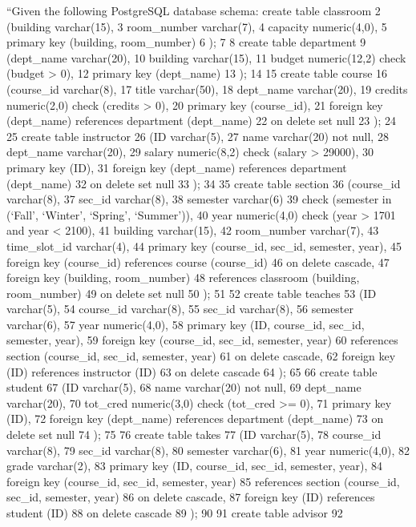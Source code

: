 \documentclass[
  letterpaper,
  DIV=11,
  numbers=noendperiod]{scrartcl}
\begin{document}
``Given the following PostgreSQL database schema: create table classroom
2 (building varchar(15), 3 room\_number varchar(7), 4 capacity
numeric(4,0), 5 primary key (building, room\_number) 6 ); 7 8 create
table department 9 (dept\_name varchar(20), 10 building varchar(15), 11
budget numeric(12,2) check (budget \textgreater{} 0), 12 primary key
(dept\_name) 13 ); 14 15 create table course 16 (course\_id varchar(8),
17 title varchar(50), 18 dept\_name varchar(20), 19 credits numeric(2,0)
check (credits \textgreater{} 0), 20 primary key (course\_id), 21
foreign key (dept\_name) references department (dept\_name) 22 on delete
set null 23 ); 24 25 create table instructor 26 (ID varchar(5), 27 name
varchar(20) not null, 28 dept\_name varchar(20), 29 salary numeric(8,2)
check (salary \textgreater{} 29000), 30 primary key (ID), 31 foreign key
(dept\_name) references department (dept\_name) 32 on delete set null 33
); 34 35 create table section 36 (course\_id varchar(8), 37 sec\_id
varchar(8), 38 semester varchar(6) 39 check (semester in (`Fall',
`Winter', `Spring', `Summer')), 40 year numeric(4,0) check (year
\textgreater{} 1701 and year \textless{} 2100), 41 building varchar(15),
42 room\_number varchar(7), 43 time\_slot\_id varchar(4), 44 primary key
(course\_id, sec\_id, semester, year), 45 foreign key (course\_id)
references course (course\_id) 46 on delete cascade, 47 foreign key
(building, room\_number) 48 references classroom (building,
room\_number) 49 on delete set null 50 ); 51 52 create table teaches 53
(ID varchar(5), 54 course\_id varchar(8), 55 sec\_id varchar(8), 56
semester varchar(6), 57 year numeric(4,0), 58 primary key (ID,
course\_id, sec\_id, semester, year), 59 foreign key (course\_id,
sec\_id, semester, year) 60 references section (course\_id, sec\_id,
semester, year) 61 on delete cascade, 62 foreign key (ID) references
instructor (ID) 63 on delete cascade 64 ); 65 66 create table student 67
(ID varchar(5), 68 name varchar(20) not null, 69 dept\_name varchar(20),
70 tot\_cred numeric(3,0) check (tot\_cred \textgreater= 0), 71 primary
key (ID), 72 foreign key (dept\_name) references department (dept\_name)
73 on delete set null 74 ); 75 76 create table takes 77 (ID varchar(5),
78 course\_id varchar(8), 79 sec\_id varchar(8), 80 semester varchar(6),
81 year numeric(4,0), 82 grade varchar(2), 83 primary key (ID,
course\_id, sec\_id, semester, year), 84 foreign key (course\_id,
sec\_id, semester, year) 85 references section (course\_id, sec\_id,
semester, year) 86 on delete cascade, 87 foreign key (ID) references
student (ID) 88 on delete cascade 89 ); 90 91 create table advisor 92
\end{document}
